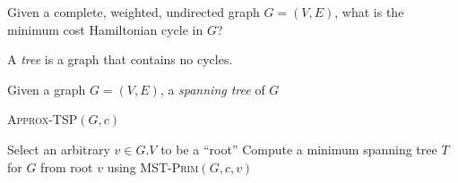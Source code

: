 \documentclass{article}
\newenvironment{definition}[2][Definition]{\begin{trivlist}
\item[\hskip \labelsep {\bfseries #1}\hskip \labelsep {\hspace{-1ex}\bfseries #2.}]}{\end{trivlist}}
\newenvironment{envsection}[1]{\begin{trivlist}
\item[\hskip \labelsep {\bfseries #1}]}{\end{trivlist}}
\begin{document}
\begin{definition}{}{}
    
\end{definition}

\begin{envsection}{Optimization Problem (TSP).}
    Given a complete, weighted, undirected graph $G = (V,E)$, what is the minimum cost Hamiltonian cycle in $G$?
\end{envsection}

\begin{definition}{ (Tree)}{}
    A \textit{tree} is a graph that contains no cycles.
\end{definition}

\begin{definition}{ (Spanning Tree)}{}
    Given a graph $G = (V,E)$, a \textit{spanning tree} of $G$
\end{definition}

\begin{algorithm}
    \renewcommand{\thealgorithm}{}
    \caption{\textsc{Approx-TSP}$(G,c)$}
    \begin{algorithmic}
        \State Select an arbitrary $v \in G.V$ to be a ``root''
        \State Compute a minimum spanning tree $T$ for $G$ from root $v$ using \textsc{MST-Prim}$(G,c,v)$
    \end{algorithmic}
\end{algorithm}


\end{document}
